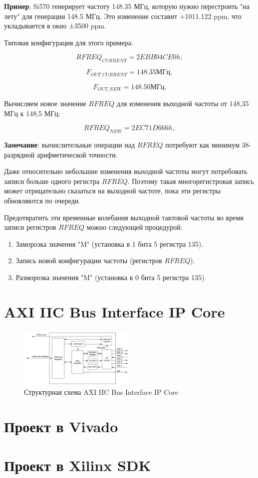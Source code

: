 \textbf{Пример}: Si570 генерирует частоту 148.35 МГц, которую нужно перестроить "на лету" для генерации 148.5 МГц. Это изменение составит +1011.122 ppm, что укладывается в окно ±3500 ppm.

Типовая конфигурация для этого примера:

\begin{equation}	
	RFREQ_{CURRENT} =  2EBB04CE0h,
\end{equation}

\begin{equation}	
	F_{OUT\_CURRENT} =  148.35 МГц,
\end{equation}

\begin{equation}	
	F_{OUT\_NEW} = 148.50 МГц.
\end{equation}

Вычисляем новое значение \(RFREQ\) для изменения выходной частоты от 148,35 МГц к 148,5 МГц:

\begin{equation}	
	RFREQ_{NEW} = 2EC71D666h,
\end{equation}

\textbf{Замечание}: вычислительные операции над \(RFREQ\) потребуют как минимум 38-разрядной арифметической точности.

Даже относительно небольшие изменения выходной частоты могут потребовать записи больше одного регистра \(RFREQ\). Поэтому такая многорегистровая запись может отрицательно сказаться на выходной частоте, пока эти регистры обновляются по очереди.

Предотвратить эти временные колебания выходной тактовой частоты во время записи регистров \(RFREQ\) можно следующей процедурой:

\begin{enumerate}
	\item Заморозка значения "M" (установка в 1 бита 5 регистра 135). 
	\item Запись новой конфигурации частоты (регистров \(RFREQ\)).
 	\item Разморозка значения "M" (установка в 0 бита 5 регистра 135).
\end{enumerate}

\section{AXI IIC Bus Interface IP Core}
\begin{figure}[!ht]
	\centering
	\includegraphics[width=0.5\textwidth]{image/IIC_core_0.png}
	\caption{Структурная схема AXI IIC Bus Interface IP Core}
	\label{IIC_core_0.PNG}
\end{figure}


\section{Проект в Vivado}

\section{Проект в Xilinx SDK}